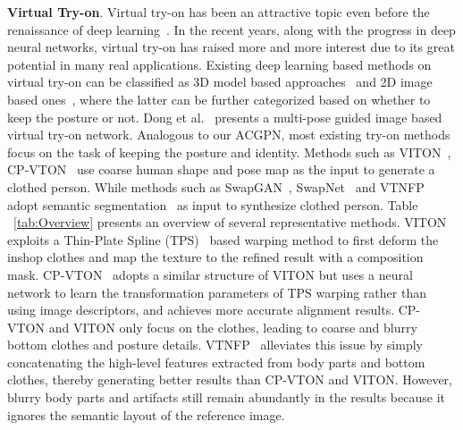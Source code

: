 \documentclass[10pt,twocolumn,letterpaper]{article}
\begin{document}
\textbf{Virtual Try-on}. Virtual try-on has been an attractive topic  even before the renaissance of deep learning~\cite{zhou2012image,DBLP:conf/ismar/EharaS06,tanaka2009texture,DBLP:journals/tvcg/HauswiesnerSR13}. In the recent years, along with the progress in deep neural networks, virtual try-on has raised more and more interest due to its great potential in many real applications. Existing deep learning based methods on virtual try-on can be classified as 3D model based approaches~\cite{DBLP:journals/cgf/SantestebanOC19,DBLP:journals/tog/BrouetSBC12,DBLP:journals/tog/GuanRHWB12,DBLP:journals/tog/Pons-MollPHB17,DBLP:journals/tog/RohmerPCHS10} and 2D image based ones~\cite{DBLP:conf/cvpr/HanWWYD18,DBLP:conf/eccv/WangZLCLY18,DBLP:journals/corr/abs-1902-11026,DBLP:conf/iccvw/JetchevB17}, where the latter can be further categorized based on whether to keep the posture or not. Dong et al.~\cite{DBLP:journals/corr/abs-1902-11026} presents a multi-pose guided image based virtual try-on network. Analogous to our ACGPN, most existing try-on methods focus on the task of keeping the posture and identity.
Methods such as VITON~\cite{DBLP:conf/cvpr/HanWWYD18}, CP-VTON~\cite{DBLP:conf/eccv/WangZLCLY18} use coarse human shape and pose map as the input to generate a clothed person.
While methods such as SwapGAN~\cite{DBLP:journals/tmm/LiuCLL19}, SwapNet~\cite{DBLP:conf/eccv/RajSCHCL18} and VTNFP~\cite{Yu_2019_ICCV} adopt semantic segmentation~\cite{DBLP:journals/pr/ZhangYPWWL19} as input to synthesize clothed person.
Table ~\ref{tab:Overview} presents an overview of several representative methods.
VITON~\cite{DBLP:conf/cvpr/HanWWYD18} exploits a Thin-Plate Spline (TPS)~\cite{duchon1977splines}  based warping method to first deform the inshop clothes and map the texture to the refined result with a composition mask.
CP-VTON~\cite{DBLP:conf/eccv/WangZLCLY18} adopts a similar structure of VITON but uses a neural network to learn the transformation parameters of TPS warping rather than using image descriptors, and achieves more accurate alignment results.
CP-VTON and VITON only focus on the clothes, leading to coarse and blurry bottom clothes and posture details. VTNFP~\cite{Yu_2019_ICCV} alleviates this issue by simply concatenating the high-level features extracted from body parts and bottom clothes, thereby generating better results than CP-VTON and VITON.
However, blurry body parts and artifacts still remain abundantly in the results because it ignores the semantic layout of the reference image. 
\end{document}
